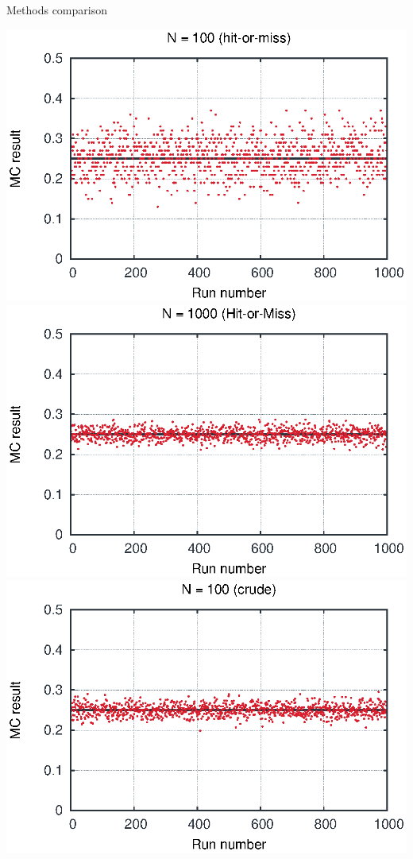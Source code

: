 \begin{emptyslide}{Methods comparison}
\null\vfill

  \twocolumn
  {
    \includegraphics[width=\columnwidth]{figures/int100.eps}
    \includegraphics[width=\columnwidth]{figures/int1000.eps}
  }
  {
    \includegraphics[width=\columnwidth]{figures/int2100.eps}
}
\end{emptyslide}
